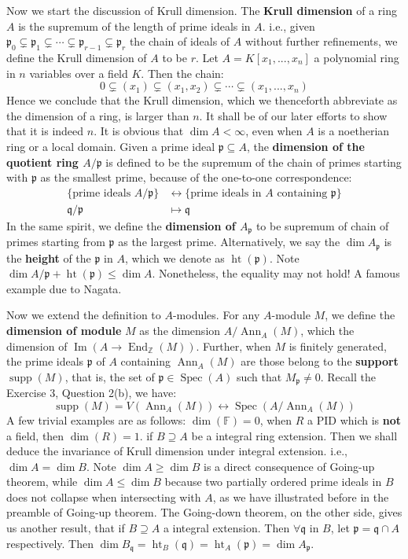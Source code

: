 \documentclass[12pt]{article}
\theoremstyle{definition}
\theoremstyle{plain}
\DeclareMathOperator{\im}{Im}
\DeclareMathOperator{\Spec}{Spec}
\DeclareMathOperator{\End}{End}
\DeclareMathOperator{\Ann}{Ann}
\DeclareMathOperator{\Ht}{ht}
\DeclareMathOperator{\supp}{supp}
\newcommand{\z}{\mathbb{Z}}
\newcommand{\field}{\mathbb{F}}
\begin{document}
Now we start the discussion of Krull dimension.
\Def The \textbf{Krull dimension} of a ring $A$ is the supremum of the length of prime ideals in $A$. i.e., given $\mathfrak{p}_0\subsetneq \mathfrak{p}_1\subsetneq \cdots \subsetneq \mathfrak{p}_{r-1} \subsetneq \mathfrak{p}_r$ the chain of ideals of $A$ without further refinements, we define the Krull dimension of $A$ to be $r$.
\Exe Let $A=K[x_1, ..., x_n]$ a polynomial ring in $n$ variables over a field $K$. Then the chain:
\[0\subsetneq (x_1)\subsetneq (x_1, x_2)\subsetneq \cdots \subsetneq (x_1, ..., x_n)\]
Hence we conclude that the Krull dimension, which we thenceforth abbreviate as the dimension of a ring, is larger than $n$. It shall be of our later efforts to show that it is indeed $n$.
\Rmk It is obvious that $\dim A<\infty$, even when $A$ is a noetherian ring or a local domain.
\Def Given a prime ideal $\mathfrak{p}\subseteq A$, the \textbf{dimension of the quotient ring $A/\mathfrak{p}$} is defined to be the supremum of the chain of primes starting with $\mathfrak{p}$ as the smallest prime, because of the one-to-one correspondence:
\begin{align*}
  \{\text{prime ideals }A/\mathfrak{p}\}&\leftrightarrow \{\text{prime ideals in }A\text{ containing }\mathfrak{p}\}\\
  \mathfrak{q}/\mathfrak{p}&\mapsto \mathfrak{q}
\end{align*}
In the same spirit, we define the \textbf{dimension of $A_\mathfrak{p}$} to be supremum of chain of primes starting from $\mathfrak{p}$ as the largest prime. Alternatively, we say the $\dim A_\mathfrak{p}$ is the \textbf{height} of the $\mathfrak{p}$ in $A$, which we denote as $\Ht(\mathfrak{p})$.
\Rmk Note $\dim A/\mathfrak{p}+\Ht(\mathfrak{p})\leq \dim A$. Nonetheless, the equality may not hold! A famous example due to Nagata.

Now we extend the definition to $A$-modules.
\Def For any $A$-module $M$, we define the \textbf{dimension of module} $M$ as the dimension $A/\Ann_A(M)$, which the dimension of $\im(A\to \End_\z(M))$. Further, when $M$ is finitely generated, the prime ideals $\mathfrak{p}$ of $A$ containing $\Ann_A(M)$ are those belong to the \textbf{support} $\supp(M)$, that is, the set of $\mathfrak{p}\in \Spec(A)$ such that $M_\mathfrak{p}\neq 0$. Recall the Exercise 3, Question 2(b), we have:
\[\supp(M)=V(\Ann_A(M))\leftrightarrow \Spec(A/\Ann_A(M))\]
\Exe A few trivial examples are as follows:
$\dim (\field)=0$, when $R$ a PID which is \textbf{not} a field, then $\dim(R)=1$.
\Exe if $B\supseteq A$ be a integral ring extension. Then we shall deduce the invariance of Krull dimension under integral extension. i.e., $\dim A=\dim B$. Note $\dim A\geq \dim B$ is a direct consequence of Going-up theorem, while $\dim A\leq \dim B$ because two partially ordered prime ideals in $B$ does not collapse when intersecting with $A$, as we have illustrated before in the preamble of Going-up theorem.
\Exe The Going-down theorem, on the other side, gives us another result, that if $B\supseteq A$ a integral extension. Then $\forall \mathfrak{q}$ in $B$, let $\mathfrak{p}=\mathfrak{q}\cap A$ respectively. Then $\dim B_\mathfrak{q}=\Ht_B(\mathfrak{q})=\Ht_A(\mathfrak{p})=\dim A_\mathfrak{p}$.
\end{document}
